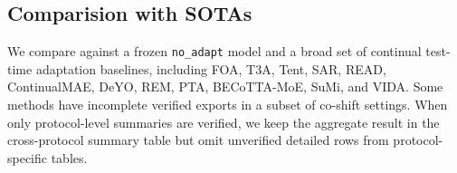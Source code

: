 \subsection{Comparision with SOTAs}
We compare against a frozen \texttt{no\_adapt} model and a broad set of continual test-time adaptation baselines, including FOA, T3A, Tent, SAR, READ, ContinualMAE, DeYO, REM, PTA, BECoTTA-MoE, SuMi, and VIDA. Some methods have incomplete verified exports in a subset of co-shift settings. When only protocol-level summaries are verified, we keep the aggregate result in the cross-protocol summary table but omit unverified detailed rows from protocol-specific tables.

\newcommand{\avgcell}[1]{\cellcolor{szoaAvgCol}#1}

